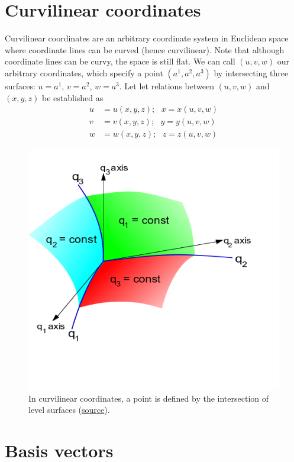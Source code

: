 \documentclass{book}
\theoremstyle{definition}
\begin{document}
\section{Curvilinear coordinates}
Curvilinear coordinates are an arbitrary coordinate system in Euclidean space where coordinate lines can be curved (hence curvilinear). Note that although coordinate lines can be curvy, the space is still flat. We can call $(u,v,w)$ our arbitrary coordinates, which specify a point $(a^1,a^2,a^3)$ by intersecting three surfaces: $u = a^1$, $v=a^2$, $w=a^3$. Let let relations between $(u,v,w)$ and $(x,y,z)$ be established as
\begin{align*}
u &= u(x,y,z); \text{ } x = x(u,v,w)\\
v &= v(x,y,z); \text{ } y = y(u,v,w)\\
w &= w(x,y,z); \text{ } z = z(u,v,w)
\end{align*} 
\begin{figure}[h!]
	\centering
	\includegraphics[scale=0.5]{gr-fig-5.png}
	\caption{In curvilinear coordinates, a point is defined by the intersection of level surfaces (\href{https://en.wikipedia.org/wiki/Curvilinear_coordinates}{source}).}
\end{figure}

\section{Basis vectors}
\end{document}
